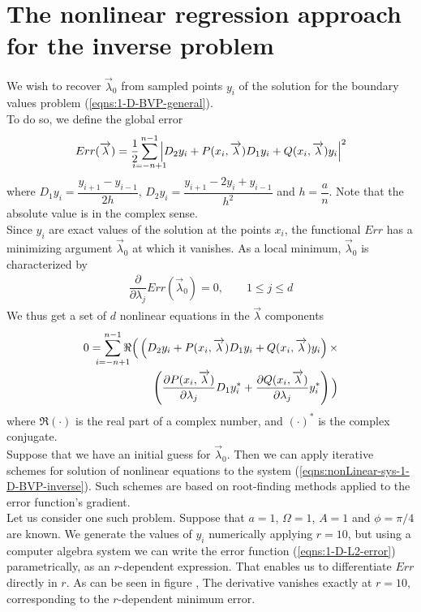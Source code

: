 \documentclass[12pt,twoside]{report}
\begin{document}
\section{The nonlinear regression approach for the inverse problem}
We wish to recover $\overrightarrow{\lambda}_0$ from sampled points $y_i$ of the solution for the boundary values problem (\ref{eqns:1-D-BVP-general}).\\
To do so, we define the global error
\begin{align}
\label{eqns:1-D-L2-error}
Err(\overrightarrow{\lambda}) = \dfrac{1}{2}\sum_{\mathclap{i=-n+1}}^{n-1} \Big \vert D_2 y_i + P(x_i, \overrightarrow{\lambda})D_1 y_i + Q(x_i, \overrightarrow{\lambda})y_i \Big \vert ^2
\end{align}
where $D_1 y_i = \dfrac{y_{i+1}-y_{i-1}}{2h}$, $D_2 y_i= \dfrac{y_{i+1}-2y_i +y_{i-1}}{h^2}$ and $h = \dfrac{a}{n}$. Note that the absolute value is in the complex sense.\\
Since $y_i$ are exact values of the solution at the points $x_i$, the functional $Err$ has a minimizing argument $\overrightarrow{\lambda}_0$ at which it vanishes. As a local minimum, $\overrightarrow{\lambda}_0$ is characterized by 
\begin{align}
\dfrac{\partial}{\partial \lambda_j} Err(\overrightarrow{\lambda}_0) = 0, \qquad 1 \leq j \leq d
\end{align}
We thus get a set of $d$ nonlinear equations in the $\overrightarrow{\lambda}$ components
\begin{align}
\label{eqns:nonLinear-sys-1-D-BVP-inverse}
0=\sum_{\mathclap{i=-n+1}}^{n-1}\Re \Big(\left(D_2 y_i + P(x_i, \overrightarrow{\lambda})D_1 y_i + Q(x_i, \overrightarrow{\lambda})y_i \right)\times\notag\\ 
\left( \dfrac{\partial P(x_i, \overrightarrow{\lambda})}{\partial \lambda_j}D_1y_i^*  + \dfrac{\partial Q(x_i, \overrightarrow{\lambda})}{\partial \lambda_j}y_i^*\right)\Big)
\end{align}
where $\Re(\cdot)$ is the real part of a complex number, and $(\cdot)^*$ is the complex conjugate.\\
Suppose that we have an initial guess for $\overrightarrow{\lambda}_0$. Then we can apply iterative schemes for solution of nonlinear equations to the system (\ref{eqns:nonLinear-sys-1-D-BVP-inverse}). Such schemes are based on root-finding methods applied to the error function's gradient. \\

Let us consider one such problem. Suppose that $a=1$, $\Omega=1$, $A=1$ and $\phi=\pi/4$ are known. We generate the values of $y_i$ numerically applying $r=10$, but using a computer algebra system we can write the error function (\ref{eqns:1-D-L2-error}) parametrically, as an $r$-dependent expression. That enables us to differentiate $Err$ directly in $r$. As can be seen in figure , The derivative vanishes exactly  at $r=10$, corresponding to the $r$-dependent minimum error.  
\end{document}
